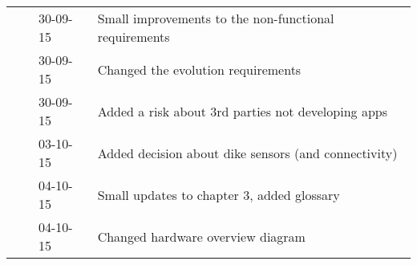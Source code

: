 \begin{longtable}{L{} L{} L{} L{}}
	                 &                       & 30-09-15      & Small improvements to the non-functional requirements                                                                                                                                                                      \\
	                 &                       & 30-09-15      & Changed the evolution requirements                                                                                                                                                                                         \\
	                 &                       & 30-09-15      & Added a risk about 3rd parties not developing apps                                                                                                                                                                         \\
	                 & 	                     & 03-10-15      & Added decision about dike sensors (and connectivity)                                                                                                                                                                       \\
		             & 			             & 04-10-15      & Small updates to chapter 3, added glossary                                                                                                                                                                                 \\        
	                 & 			             & 04-10-15      & Changed hardware overview diagram                                                                                                                                                                                          \\
	                 

\end{longtable}
